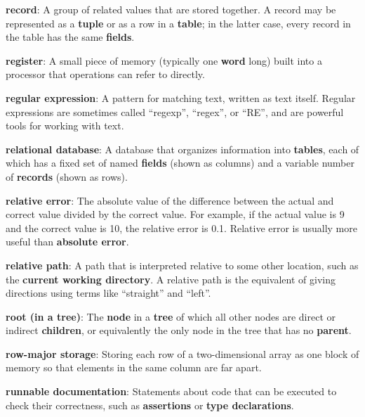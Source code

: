 \documentclass[krantzl]{krantz}
\newcommand{\glosskey}[1]{\textbf{#1}}
\begin{document}
\noindent \textbf{{\newline}\glosskey{record}}: 
A group of related values that are stored together. A record may be represented as a \glosskey{tuple} or as a row in a \glosskey{table}; in the latter case, every record in the table has the same \glosskey{fields}.


\noindent \textbf{{\newline}\glosskey{register}}: 
A small piece of memory (typically one \glosskey{word} long) built into a processor that operations can refer to directly.


\noindent \textbf{{\newline}\glosskey{regular expression}}: 
A pattern for matching text, written as text itself. Regular expressions are sometimes called “regexp”, “regex”, or “RE”, and are powerful tools for working with text.


\noindent \textbf{{\newline}\glosskey{relational database}}: 
A database that organizes information into \glosskey{tables}, each of which has a fixed set of named \glosskey{fields} (shown as columns) and a variable number of \glosskey{records} (shown as rows).


\noindent \textbf{{\newline}\glosskey{relative error}}: 
The absolute value of the difference between the actual and correct value divided by the correct value. For example, if the actual value is 9 and the correct value is 10, the relative error is 0.1. Relative error is usually more useful than \glosskey{absolute error}.


\noindent \textbf{{\newline}\glosskey{relative path}}: 
A path that is interpreted relative to some other location, such as the \glosskey{current working directory}. A relative path is the equivalent of giving directions using terms like “straight” and “left”.


\noindent \textbf{{\newline}\glosskey{root (in a tree)}}: 
The \glosskey{node} in a \glosskey{tree} of which all other nodes are direct or indirect \glosskey{children}, or equivalently the only node in the tree that has no \glosskey{parent}.


\noindent \textbf{{\newline}\glosskey{row-major storage}}: 
Storing each row of a two-dimensional array as one block of memory so that elements in the same column are far apart.


\noindent \textbf{{\newline}\glosskey{runnable documentation}}: 
Statements about code that can be executed to check their correctness, such as \glosskey{assertions} or \glosskey{type declarations}.
\end{document}
